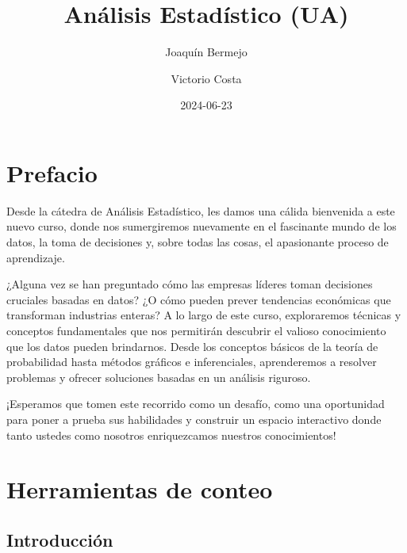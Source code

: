 \documentclass[
  letterpaper,
  DIV=11,
  numbers=noendperiod]{scrreprt}
\title{Análisis Estadístico (UA)}
\author{Joaquín Bermejo \and Victorio Costa}
\date{2024-06-23}
\renewcommand*\contentsname{Tabla de contenidos}
\newcommand\contentsname{Tabla de contenidos}
\begin{document}
\maketitle
\ifdefined\Shaded\renewenvironment{Shaded}{\begin{tcolorbox}[interior hidden, borderline west={3pt}{0pt}{shadecolor}, sharp corners, breakable, boxrule=0pt, frame hidden, enhanced]}{\end{tcolorbox}}\fi

\renewcommand*\contentsname{Tabla de contenidos}
{
\hypersetup{linkcolor=}
\setcounter{tocdepth}{2}
\tableofcontents
}

\hypertarget{prefacio}{%
\chapter*{Prefacio}\label{prefacio}}


Desde la cátedra de Análisis Estadístico, les damos una cálida
bienvenida a este nuevo curso, donde nos sumergiremos nuevamente en el
fascinante mundo de los datos, la toma de decisiones y, sobre todas las
cosas, el apasionante proceso de aprendizaje.

¿Alguna vez se han preguntado cómo las empresas líderes toman decisiones
cruciales basadas en datos? ¿O cómo pueden prever tendencias económicas
que transforman industrias enteras? A lo largo de este curso,
exploraremos técnicas y conceptos fundamentales que nos permitirán
descubrir el valioso conocimiento que los datos pueden brindarnos. Desde
los conceptos básicos de la teoría de probabilidad hasta métodos
gráficos e inferenciales, aprenderemos a resolver problemas y ofrecer
soluciones basadas en un análisis riguroso.

¡Esperamos que tomen este recorrido como un desafío, como una
oportunidad para poner a prueba sus habilidades y construir un espacio
interactivo donde tanto ustedes como nosotros enriquezcamos nuestros
conocimientos!


\hypertarget{herramientas-de-conteo}{%
\chapter{Herramientas de conteo}\label{herramientas-de-conteo}}

\hypertarget{introducciuxf3n}{%
\section{Introducción}\label{introducciuxf3n}}
\end{document}
